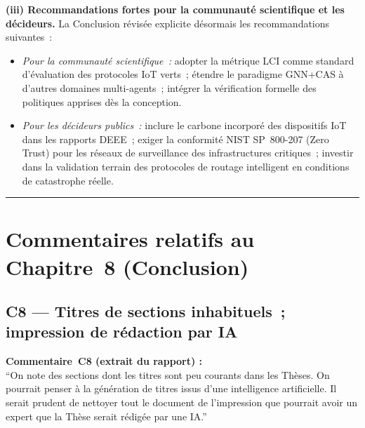 \documentclass[12pt,a4paper]{article}
\newcommand{\Commentaire}[2]{%
  \begin{reviewerbox}
    \textbf{Commentaire~#1 (extrait du rapport) :}\\#2
  \end{reviewerbox}%
}
\begin{document}
{\textbf{(iii) Recommandations fortes pour la communauté scientifique et les décideurs.}
La Conclusion révisée explicite désormais les recommandations suivantes~:
\begin{itemize}[leftmargin=*]
  \item \textit{Pour la communauté scientifique~:} adopter la métrique LCI comme standard d'évaluation des protocoles IoT verts~; étendre le paradigme GNN+CAS à d'autres domaines multi-agents~; intégrer la vérification formelle des politiques apprises dès la conception.
  \item \textit{Pour les décideurs publics~:} inclure le carbone incorporé des dispositifs IoT dans les rapports DEEE~; exiger la conformité NIST SP~800-207 (Zero Trust) pour les réseaux de surveillance des infrastructures critiques~; investir dans la validation terrain des protocoles de routage intelligent en conditions de catastrophe réelle.
\end{itemize}
}

\bigskip
\hrule
\bigskip

\section*{Commentaires relatifs au Chapitre~8 (Conclusion)}

\subsection*{C8 --- Titres de sections inhabituels~; impression de rédaction par IA}

\Commentaire{C8}{
  ``On note des sections dont les titres sont peu courants dans les Thèses. On pourrait penser à la
  génération de titres issus d'une intelligence artificielle. Il serait prudent de nettoyer tout le
  document de l'impression que pourrait avoir un expert que la Thèse serait rédigée par une IA.''
}
\end{document}
